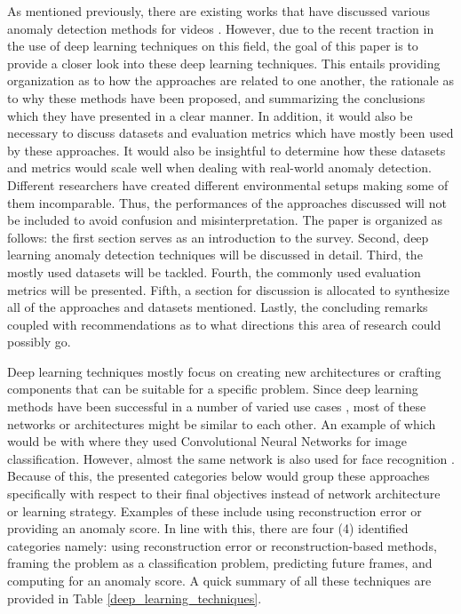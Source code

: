 As mentioned previously, there are existing works that have discussed various anomaly detection methods for videos . However, due to the recent traction in the use of deep learning techniques on this field, the goal of this paper is to provide a closer look into these deep learning techniques. This entails providing organization as to how the approaches are related to one another, the rationale as to why these methods have been proposed, and summarizing the conclusions which they have presented in a clear manner. In addition, it would also be necessary to discuss datasets and evaluation metrics which have mostly been used by these approaches. It would also be insightful to determine how these datasets and metrics would scale well when dealing with real-world anomaly detection. Different researchers have created different environmental setups  making some of them incomparable. Thus, the performances of the approaches discussed will not be included to avoid confusion and misinterpretation.
The paper is organized as follows: the first section serves as an introduction to the survey. Second, deep learning anomaly detection techniques will be discussed in detail. Third, the mostly used datasets will be tackled. Fourth, the commonly used evaluation metrics will be presented. Fifth, a section for discussion is allocated to synthesize all of the approaches and datasets mentioned. Lastly, the concluding remarks coupled with recommendations as to what directions this area of research could possibly go.

Deep learning techniques mostly focus on creating new architectures or crafting components that can be suitable for a specific problem. Since deep learning methods have been successful in a number of varied use cases , most of these networks or architectures might be similar to each other. An example of which would be with  where they used Convolutional Neural Networks for image classification. However, almost the same network is also used for face recognition . Because of this, the presented categories below would group these approaches specifically with respect to their final objectives instead of network architecture or learning strategy. Examples of these include using reconstruction error or providing an anomaly score. In line with this, there are four (4) identified categories namely: using reconstruction error or reconstruction-based methods, framing the problem as a classification problem, predicting future frames, and computing for an anomaly score. A quick summary of all these techniques are provided in Table \ref{deep_learning_techniques}.

